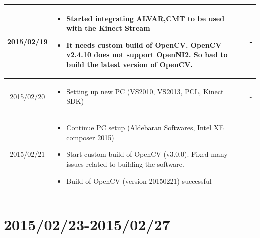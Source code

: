 \documentclass[11pt]{article} %
\begin{document}
\begin{center}
\begin{longtable}{ | c | p{6cm} | p{5cm} |}
    2015/02/19         & 
    \begin{itemize}
     \item Started integrating ALVAR,CMT to be used with the Kinect Stream
     \item It needs custom build of OpenCV. OpenCV v2.4.10 does not support OpenNI2. So had to build the latest version of OpenCV.
    \end{itemize}   
    & - \\
    \hline								
  										 
    2015/02/20         & 
    \begin{itemize}
      \item Setting up new PC (VS2010, VS2013, PCL, Kinect SDK)
    \end{itemize}   
    & - \\
    \hline
  					
  	2015/02/21         & 
  	\begin{itemize}
     \item Continue PC setup (Aldebaran Softwares, Intel XE composer 2015)
     \item Start custom build of OpenCV (v3.0.0). Fixed many issues related to building the software.
     \item Build of OpenCV (version 20150221) successful
    \end{itemize}   
  	& - \\
  	\hline
  										 
    \end{longtable}
\end{center}

\clearpage

\section{2015/02/23-2015/02/27}
\end{document}
